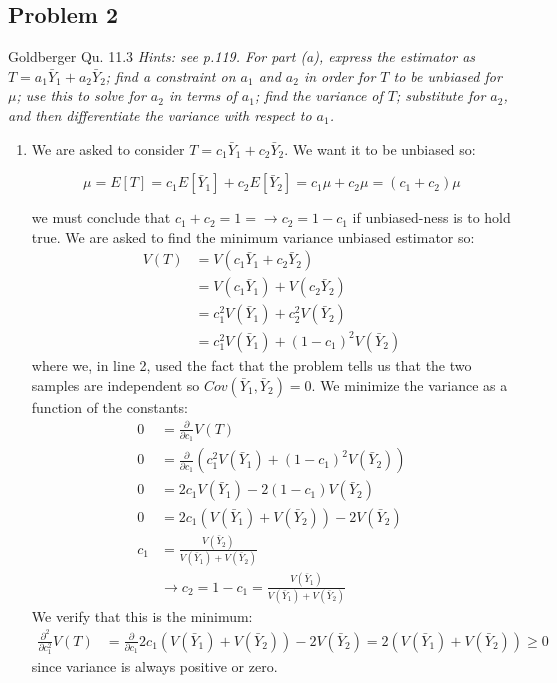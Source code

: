 \documentclass{article}
\newcommand{\1}{\mathbf{1}}
\begin{document}
\newpage
\subsection*{Problem 2}
Goldberger Qu. 11.3
 {\it Hints: see p.119. For part (a), express the estimator as $T=a_1{\bar{Y}_1} +a_2{\bar{Y}_2}$; find a constraint on $a_1$ and $a_2$ in order for $T$ to be unbiased for $\mu$; use this to solve for $a_2$ in terms of $a_1$; find the variance of $T$; substitute for $a_2$, and then differentiate the variance with respect to $a_1$.}
 \begin{enumerate}
     \item We are asked to consider $T=c_1\bar Y_1 + c_2 \bar Y_2$. We want it to be unbiased so:
     
     $$ \mu = E[T] = c_1 E[\bar Y_1] + c_2 E[\bar Y_2] = c_1\mu + c_2\mu = (c_1 + c_2)\mu  $$
     
     we must conclude that $c_1 + c_2 = 1 = \rightarrow c_2 = 1-c_1$ if unbiased-ness is to hold true. We are asked to find the minimum variance unbiased estimator so:
     \begin{align*}
         V(T) &= V(c_1\bar Y_1 + c_2 \bar Y_2) \\
         &= V(c_1\bar Y_1) + V(c_2 \bar Y_2) \\
         &= c_1^2 V(\bar Y_1) + c_2^2 V(\bar Y_2) \\
         &=  c_1^2 V(\bar Y_1) + (1-c_1)^2 V(\bar Y_2) 
     \end{align*}
     where we, in line 2, used the fact that the problem tells us that the two samples are independent so $Cov(\bar Y_1, \bar Y_2)=0$. We minimize the variance as a function of the constants:
    \begin{align*}
        0 &= \frac{\partial}{\partial c_1} V(T)  \\
        0 &= \frac{\partial}{\partial c_1} \left( c_1^2 V(\bar Y_1) + (1-c_1)^2 V(\bar Y_2)  \right) \\
        0 &= 2c_1 V(\bar Y_1) - 2(1-c_1)V(\bar Y_2) \\
        0 &= 2c_1( V(\bar Y_1) + V(\bar Y_2) ) - 2V(\bar Y_2) \\
        c_1 &= \frac{V(\bar Y_2)}{V(\bar Y_1) + V(\bar Y_2)} \\
        &\rightarrow c_2 = 1 - c_1 = \frac{V(\bar Y_1)}{V(\bar Y_1) + V(\bar Y_2)}
    \end{align*}
    We verify that this is the minimum:
    \begin{align*}
        \frac{\partial^2}{\partial c_1^2} V(T) &= \frac{\partial}{\partial c_1}   2c_1( V(\bar Y_1) + V(\bar Y_2) ) - 2V(\bar Y_2) = 2( V(\bar Y_1) + V(\bar Y_2) ) \geq 0
    \end{align*}
    since variance is always positive or zero.
    

\end{enumerate}
\end{document}

